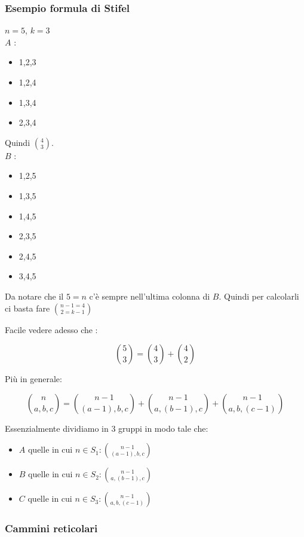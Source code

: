 \documentclass[11pt]{article}
\begin{document}
			\subsubsection{Esempio formula di Stifel}

			$n=5$, $k=3$\\

			$A$ : \begin{itemize}
				\item 1,2,3
				\item 1,2,4
				\item 1,3,4
				\item 2,3,4
			\end{itemize}

			Quindi $\binom{4}{3}$.\\

			$B$ : \begin{itemize}
				\item 1,2,5
				\item 1,3,5
				\item 1,4,5
				\item 2,3,5
				\item 2,4,5
				\item 3,4,5
			\end{itemize}

			Da notare che il $5 = n$ c'\`e sempre nell'ultima colonna di $B$.
			Quindi per calcolarli ci basta fare $\binom{n-1=4}{2=k-1}$

			Facile vedere adesso che :

			\[
				\binom{5}{3} = \binom{4}{3} + \binom{4}{2}
			\]

			Pi\`u in generale:

			\[
				\binom{n}{a, b, c} = \binom{n-1}{(a-1), b, c} + 
				\binom{n-1}{a, (b-1), c} + \binom{n-1}{a, b, (c-1)}
			\]

			Essenzialmente dividiamo in 3 gruppi in modo tale che:

			\begin{itemize}	
				\item $A$ quelle in cui $n \in S_1 : \binom{n-1}{(a-1), b, c}$
				\item $B$ quelle in cui $n \in S_2 : \binom{n-1}{a, (b-1), c}$
				\item $C$ quelle in cui $n \in S_3 : \binom{n-1}{a, b, (c-1)}$
			\end{itemize}
			
			\subsubsection{Cammini reticolari}
\end{document}
